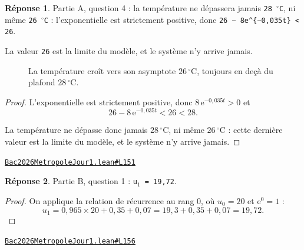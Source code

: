 \documentclass[11pt,a4paper]{article}
\theoremstyle{definition}
\theoremstyle{plain}
\theoremstyle{definition}
\newtheorem*{reponse}{Réponse}
\newcommand{\source}[2]{\par\smallskip\noindent\hfill{\footnotesize\href{#1}{\texttt{#2}}}\par\smallskip}
\begin{document}
\begin{reponse}
Partie A, question 4 : la température ne dépassera jamais \texttt{28 \(^\circ\)C}, ni même
\texttt{26 \(^\circ\)C} : l'exponentielle est strictement positive, donc \texttt{26 − 8e\textasciicircum{}\{−0,035t\} < 26}.

La valeur \texttt{26} est la limite du modèle, et le système n'y arrive jamais.
\end{reponse}

\begin{figure}[h]
\centering

\caption{La température croît vers son asymptote \(26\,^\circ\mathrm{C}\), toujours en deçà du plafond \(28\,^\circ\mathrm{C}\).}
\end{figure}
\begin{proof}
L'exponentielle est strictement positive, donc $8\,\mathrm{e}^{-0{,}035t} > 0$ et
\[ 26 - 8\,\mathrm{e}^{-0{,}035t} < 26 < 28 . \]

La température ne dépasse donc jamais $28\,^\circ\mathrm{C}$, ni même
$26\,^\circ\mathrm{C}$ : cette dernière valeur est la limite du modèle, et le système n'y
arrive jamais.
\end{proof}
\source{https://github.com/Commutator-IO/learn-lean/blob/main/exams/2026/Bac2026MetropoleJour1.lean\#L151}{Bac2026MetropoleJour1.lean\#L151}

\begin{reponse}
Partie B, question 1 : \texttt{u\(_{1}\) = 19,72}.
\end{reponse}
\begin{proof}
On applique la relation de récurrence au rang $0$, où $u_0 = 20$ et
$\mathrm{e}^{0} = 1$ :
\[ u_1 = 0{,}965 \times 20 + 0{,}35 + 0{,}07 = 19{,}3 + 0{,}35 + 0{,}07 = 19{,}72 . \]
\end{proof}
\source{https://github.com/Commutator-IO/learn-lean/blob/main/exams/2026/Bac2026MetropoleJour1.lean\#L156}{Bac2026MetropoleJour1.lean\#L156}
\end{document}
